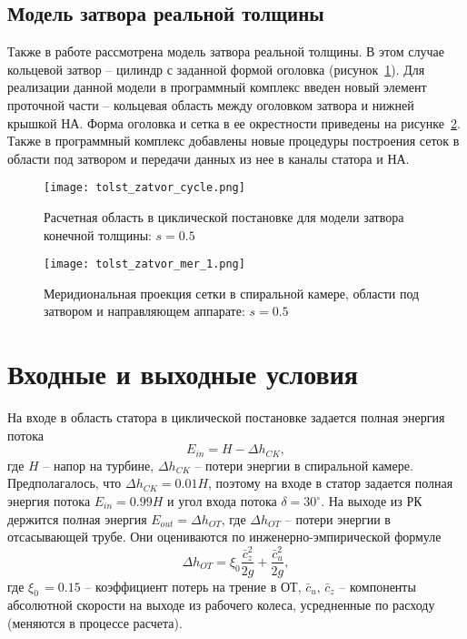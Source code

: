 \subsection{Модель затвора реальной толщины}
\label{s:422}
Также в работе рассмотрена модель затвора реальной толщины. В этом случае кольцевой затвор -- цилиндр с 
заданной формой оголовка (рисунок~\ref{fig:3}). 
Для реализации данной модели в программный комплекс введен новый 
элемент проточной части -- кольцевая область между оголовком затвора и нижней крышкой НА. 
Форма оголовка и сетка в ее окрестности приведены на рисунке~\ref{fig:31}. Также в программный комплекс 
добавлены новые процедуры построения сеток в области под затвором и передачи данных из нее 
в каналы статора и НА.
\begin{figure}[!hb]
  \centering \texttt{[image: tolst\_zatvor\_cycle.png]}\\  
  \caption{Расчетная область в циклической постановке для модели затвора конечной толщины: $s=0.5$}
  \label{fig:3}
\end{figure}
\begin{figure}[!hb]
  \centering \texttt{[image: tolst\_zatvor\_mer\_1.png]}\\  
  \caption{Меридиональная проекция сетки в спиральной камере, области под затвором и направляющем 
           аппарате: $s=0.5$}
  \label{fig:31}
\end{figure}

\section{Входные и выходные условия}
\label{s:43}
На входе в область статора в циклической постановке задается полная энергия потока
\begin{equation*}
  E_{in} = H-\Delta h_{CK},
\end{equation*}
где $H$ -- напор на турбине, $\Delta h_{CK}$ -- потери энергии в спиральной камере. 
Предполагалось, что $\Delta h_{CK}=0.01H$, поэтому на входе в статор задается полная энергия 
потока $E_{in} = 0.99H$ и угол входа потока $\delta  = 30^\circ$. На выходе из РК держится полная 
энергия $E_{out} = \Delta h_{OT}$, 
где $\Delta h_{OT}$ -- потери энергии в отсасывающей трубе. Они оцениваются по инженерно-эмпирической формуле 
\cite{idelchik,etinberg}
\begin{equation*}
  \Delta h_{OT} = \xi_0 \frac{{\bar c_z^2}}{{2g}}+\frac{{\bar c_u^2 }}{{2g}},
\end{equation*}
где $\xi _0 \, = 0.15$ -- коэффициент потерь на трение в ОТ, $\bar c_u ,\,\bar c_z $ -- компоненты абсолютной 
скорости на выходе из рабочего колеса, усредненные по расходу (меняются в процессе расчета). 

